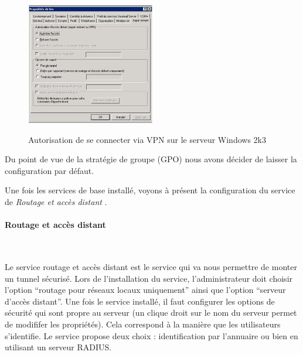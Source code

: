 \begin{figure}[H]
	\begin{center}
		\includegraphics[width=0.50\textwidth]{partie_2/screen_windows/vpn.JPG}\\
	\end{center}
	\caption{Autorisation de se connecter via VPN sur le serveur Windows 2k3}
	\label{VPN_AUTORISATION}
\end{figure}

Du point de vue de la stratégie de groupe (GPO) nous avons décider de laisser la configuration par défaut.

Une fois les services de base installé, voyons à présent la configuration du service de \textit{Routage et accès distant} .

\paragraph{Routage et accès distant}
~\


Le service routage et accès distant est le service qui va nous permettre de monter un tunnel sécurisé. Lors de l'installation du service, l'administrateur doit choisir l'option ``routage pour réseaux locaux uniquement'' ainsi que l'option ``serveur d'accès distant''. Une fois le service installé, il faut configurer les options de sécurité qui sont propre au serveur (un clique droit sur le nom du serveur permet de modififer les propriétés). Cela correspond à la manière que les utilisateurs s'identifie. Le service propose deux choix : identification par l'annuaire ou bien en utilisant un serveur RADIUS.

